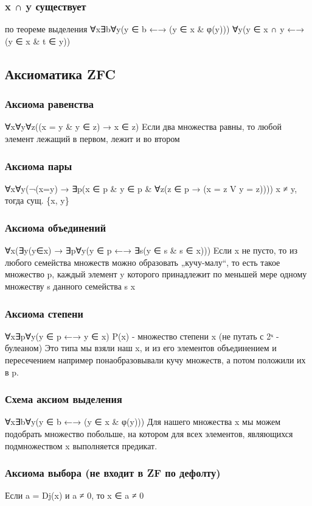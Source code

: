 \documentclass[11pt]{article}
\begin{document}
\subsubsection{x ∩ y существует}
\label{sec-15-1-4}
по теореме выделения
∀x∃b∀y(y ∈ b ←→ (y ∈ x \& φ(y)))
∀y(y ∈ x ∩ y ←→ (y ∈ x \& t ∈ y))
\subsection{Аксиоматика ZFC}
\label{sec-15-2}
\subsubsection{Аксиома равенства}
\label{sec-15-2-1}
∀x∀y∀z((x = y \& y ∈ z) → x ∈ z)
Eсли два множества равны, то любой элемент лежащий в первом,
лежит и во втором
\subsubsection{Аксиома пары}
\label{sec-15-2-2}
∀x∀y(¬(x=y) → ∃p(x ∈ p \& y ∈ p \& ∀z(z ∈ p → (x = z V y = z))))
x ≠ y, тогда сущ. \{x, y\}
\subsubsection{Аксиома объединений}
\label{sec-15-2-3}
∀x(∃y(y∈x) → ∃p∀y(y ∈ p ←→ ∃s(y ∈ s \& s ∈ x)))
Eсли x не пусто, то из любого семейства множеств можно
образовать „кучу-малу“, то есть такое множество p,
каждый элемент y которого принадлежит по меньшей мере
одному множеству s данного семейства s x
\subsubsection{Аксиома степени}
\label{sec-15-2-4}
∀x∃p∀y(y ∈ p ←→ y ∈ x)
P(x) - множество степени x (не путать с 2ˣ - булеаном)
Это типа мы взяли наш x, и из его элементов объединением и
пересечением например понаобразовывали кучу множеств, а потом
положили их в p.
\subsubsection{Схема аксиом выделения}
\label{sec-15-2-5}
∀x∃b∀y(y ∈ b ←→ (y ∈ x \& φ(y)))
Для нашего множества x мы можем подобрать множество побольше,
на котором для всех элементов, являющихся подмножеством x
выполняется предикат.
\subsubsection{Аксиома выбора (не входит в ZF по дефолту)}
\label{sec-15-2-6}
Если a = Dj(x) и a ≠ 0, то x ∈ a ≠ 0
\end{document}
